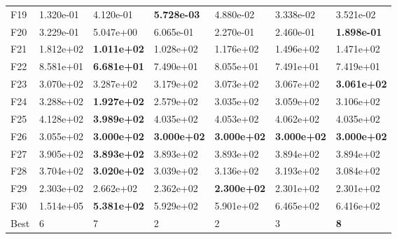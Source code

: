 \begin{tabular}{lllllll}
F19 & 1.320e-01 & 4.120e-01 & \textbf{5.728e-03} & 4.880e-02 & 3.338e-02 & 3.521e-02 \\
F20 & 3.229e-01 & 5.047e+00 & 6.065e-01 & 2.270e-01 & 2.460e-01 & \textbf{1.898e-01} \\
F21 & 1.812e+02 & \textbf{1.011e+02} & 1.028e+02 & 1.176e+02 & 1.496e+02 & 1.471e+02 \\
F22 & 8.581e+01 & \textbf{6.681e+01} & 7.490e+01 & 8.055e+01 & 7.491e+01 & 7.419e+01 \\
F23 & 3.070e+02 & 3.287e+02 & 3.179e+02 & 3.073e+02 & 3.067e+02 & \textbf{3.061e+02} \\
F24 & 3.288e+02 & \textbf{1.927e+02} & 2.579e+02 & 3.035e+02 & 3.059e+02 & 3.106e+02 \\
F25 & 4.128e+02 & \textbf{3.989e+02} & 4.035e+02 & 4.053e+02 & 4.062e+02 & 4.035e+02 \\
F26 & 3.055e+02 & \textbf{3.000e+02} & \textbf{3.000e+02} & \textbf{3.000e+02} & \textbf{3.000e+02} & \textbf{3.000e+02} \\
F27 & 3.905e+02 & \textbf{3.893e+02} & 3.893e+02 & 3.893e+02 & 3.894e+02 & 3.894e+02 \\
F28 & 3.704e+02 & \textbf{3.020e+02} & 3.039e+02 & 3.136e+02 & 3.193e+02 & 3.084e+02 \\
F29 & 2.303e+02 & 2.662e+02 & 2.362e+02 & \textbf{2.300e+02} & 2.301e+02 & 2.301e+02 \\
F30 & 1.514e+05 & \textbf{5.381e+02} & 5.929e+02 & 5.901e+02 & 6.465e+02 & 6.416e+02 \\
\midrule
Best & 6 & 7 & 2 & 2 & 3 & \textbf{8} \\
\bottomrule
\end{tabular}
